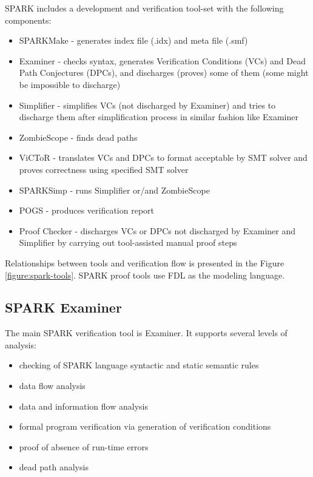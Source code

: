 \newpage

SPARK includes a development and verification tool-set with the following components:
\begin{itemize}
	\item SPARKMake - generates index file (.idx) and meta file (.smf)
	\item Examiner - checks syntax, generates Verification Conditions (VCs) and Dead Path Conjectures (DPCs), and discharges (proves) some of them (some might be impossible to discharge)
	\item Simplifier - simplifies VCs (not discharged by Examiner) and tries to discharge them after simplification process in similar fashion like Examiner
	\item ZombieScope - finds dead paths
	\item ViCToR - translates VCs and DPCs to format acceptable by SMT solver and proves correctness using specified SMT solver
	\item SPARKSimp - runs Simplifier or/and ZombieScope
	\item POGS - produces verification report
	\item Proof Checker - discharges VCs or DPCs not discharged by Examiner and Simplifier by carrying out tool-assisted manual proof steps
\end{itemize}

Relationships between tools and verification flow is presented in the Figure \ref{figure:spark-tools}. SPARK proof tools use FDL as the modeling language. 



\subsection{SPARK Examiner}
\label{background:sparkverification:examiner}

The main SPARK verification tool is Examiner. It supports several levels of analysis:
\begin{itemize}
	\item checking of SPARK language syntactic and static semantic rules
	\item data flow analysis
	\item data and information flow analysis
	\item formal program verification via generation of verification conditions
	\item proof of absence of run-time errors
	\item dead path analysis
\end{itemize}

